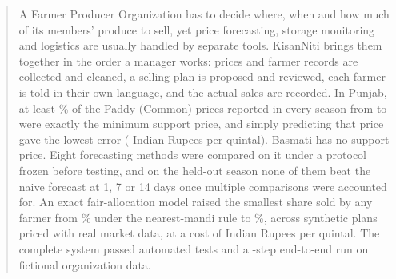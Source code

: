 \begin{abstract}
A Farmer Producer Organization has to decide where, when and how much of its members' produce to sell, yet price forecasting,
storage monitoring and logistics are usually handled by separate tools. KisanNiti brings them together in the order a manager works:
prices and farmer records are collected and cleaned, a selling plan is proposed and reviewed, each farmer is told in their own
language, and the actual sales are recorded. In Punjab, at least \% of the Paddy (Common) prices reported in every
season from  to  were exactly the minimum support price, and simply predicting that price gave the lowest
error ( Indian Rupees per quintal). Basmati has no support price. Eight forecasting methods were compared on it under a
protocol frozen before testing, and on the held-out season none of them beat the naive forecast at 1, 7 or 14 days once multiple
comparisons were accounted for. An exact fair-allocation model raised the smallest share sold by any farmer from
\% under the nearest-mandi rule to \%, across
 synthetic plans priced with real market data, at a cost of  Indian Rupees
per quintal. The complete system passed  automated tests and a -step end-to-end run on fictional
organization data.
\end{abstract}
